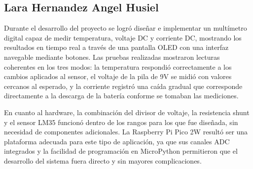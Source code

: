 \documentclass[letterpaper,12pt]{article}
\begin{document}
        \subsection{Lara Hernandez Angel Husiel}

        Durante el desarrollo del proyecto se logró diseñar e implementar un multímetro digital capaz de medir temperatura, voltaje DC y corriente DC, mostrando los resultados en tiempo real a través de una pantalla OLED con una interfaz navegable mediante botones. Las pruebas realizadas mostraron lecturas coherentes en los tres modos: la temperatura respondió correctamente a los cambios aplicados al sensor, el voltaje de la pila de 9V se midió con valores cercanos al esperado, y la corriente registró una caída gradual que corresponde directamente a la descarga de la batería conforme se tomaban las mediciones.

        En cuanto al hardware, la combinación del divisor de voltaje, la resistencia shunt y el sensor LM35 funcionó dentro de los rangos para los que fue diseñada, sin necesidad de componentes adicionales. La Raspberry Pi Pico 2W resultó ser una plataforma adecuada para este tipo de aplicación, ya que sus canales ADC integrados y la facilidad de programación en MicroPython permitieron que el desarrollo del sistema fuera directo y sin mayores complicaciones.
    \newpage
    \nocite{*}
    \printbibliography[heading=bibintoc, title={Referencias}]
\end{document}
